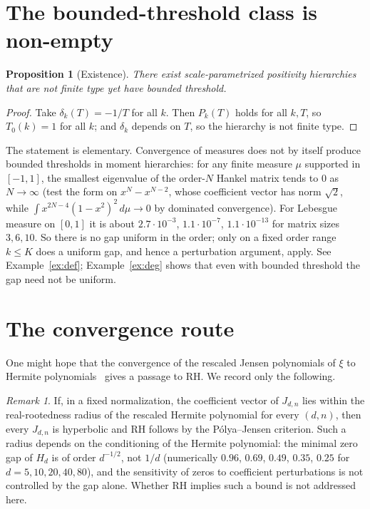 \documentclass[11pt]{amsart}
\newtheorem{proposition}[theorem]{Proposition}
\theoremstyle{definition}
\theoremstyle{remark}
\newtheorem{remark}[theorem]{Remark}
\begin{document}
\section{The bounded-threshold class is non-empty}
\begin{proposition}[Existence]\label{prop:exist}
There exist scale-parametrized positivity hierarchies that are not finite type
yet have bounded threshold.
\end{proposition}
\begin{proof}
Take $\delta_k(T)=-1/T$ for all $k$. Then $P_k(T)$ holds for all $k,T$, so
$T_0(k)=1$ for all $k$; and $\delta_k$ depends on $T$, so the hierarchy is not
finite type.
\end{proof}
The statement is elementary. Convergence of measures does not by itself produce
bounded thresholds in moment hierarchies: for any finite measure $\mu$
supported in $[-1,1]$, the smallest eigenvalue of the order-$N$ Hankel matrix
tends to $0$ as $N\to\infty$ (test the form on $x^N-x^{N-2}$, whose coefficient
vector has norm $\sqrt2$, while $\int x^{2N-4}(1-x^2)^2\,d\mu\to0$ by dominated
convergence). For Lebesgue measure on $[0,1]$ it is about $2.7\cdot10^{-3}$,
$1.1\cdot10^{-7}$, $1.1\cdot10^{-13}$ for matrix sizes $3,6,10$. So there is no
gap uniform in the order; only on a fixed order range $k\le K$ does a uniform gap,
and hence a perturbation argument, apply. See Example~\ref{ex:def}; Example~\ref{ex:deg} shows that even with bounded
threshold the gap need not be uniform.

\section{The convergence route}
One might hope that the convergence of the rescaled Jensen polynomials of $\xi$
to Hermite polynomials~\cite{GORZ} gives a passage to RH. We record only the
following.
\begin{remark}\label{thm:overRH}
If, in a fixed normalization, the coefficient vector of $J_{d,n}$ lies within the
real-rootedness radius of the rescaled Hermite polynomial for every $(d,n)$, then
every $J_{d,n}$ is hyperbolic and RH follows by the P\'olya--Jensen criterion.
Such a radius depends on the conditioning of the Hermite polynomial: the minimal
zero gap of $H_d$ is of order $d^{-1/2}$, not $1/d$ (numerically $0.96$, $0.69$,
$0.49$, $0.35$, $0.25$ for $d=5,10,20,40,80$), and the sensitivity of zeros to
coefficient perturbations is not controlled by the gap alone. Whether RH implies
such a bound is not addressed here.
\end{remark}
\end{document}
